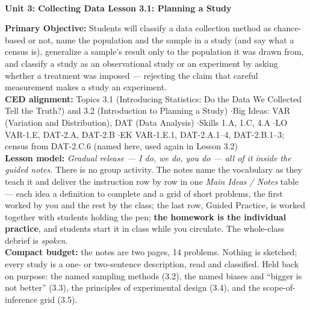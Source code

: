 \documentclass[10pt]{article}
\newcommand{\UnitNumberName}{Unit 3: Collecting Data \quad}
\newcommand{\LessonNumberName}{Lesson 3.1: Planning a Study}
\begin{document}
\begin{center}
    {\Large\bfseries \CourseName \\
    {\small\bfseries \UnitNumberName \LessonNumberName}}
\end{center}

\begin{tcolorbox}[colback=sky, colframe=navy, boxrule=0.9pt, arc=2mm,
    left=2mm, right=2mm, top=1.5mm, bottom=1.5mm]
    \textbf{Primary Objective:} Students will classify a data collection method as chance-based
    or not, name the population and the sample in a study (and say what a census is),
    generalize a sample's result only to the population it was drawn from, and classify a study
    as an observational study or an experiment by asking whether a treatment was imposed ---
    rejecting the claim that careful measurement makes a study an experiment.
    \\[2pt]
    \textbf{CED alignment:} Topics 3.1 (Introducing Statistics: Do the Data We Collected Tell
    the Truth?) and 3.2 (Introduction to Planning a Study) \quad$\cdot$\quad Big Ideas: VAR
    (Variation and Distribution), DAT (Data Analysis) \quad$\cdot$\quad Skills 1.A, 1.C, 4.A
    \quad$\cdot$\quad LO VAR-1.E, DAT-2.A, DAT-2.B \quad$\cdot$\quad EK VAR-1.E.1, DAT-2.A.1--4,
    DAT-2.B.1--3; census from DAT-2.C.6 (named here, used again in Lesson 3.2)
    \\[2pt]
    \textbf{Lesson model:} \emph{Gradual release --- I do, we do, you do --- all of it inside
    the guided notes.} There is no group activity. The notes name the vocabulary as they teach
    it and deliver the instruction row by row in one \emph{Main Ideas / Notes} table --- each
    idea a definition to complete and a grid of short problems, the first worked by you and the
    rest by the class; the last row, Guided Practice, is worked together with students holding
    the pen; \textbf{the homework is the individual practice}, and students start it in class
    while you circulate. The whole-class debrief is \emph{spoken}.
    \\[2pt]
    \textbf{Compact budget:} the notes are two pages, 14 problems. Nothing is sketched; every
    study is a one- or two-sentence description, read and classified. Held back on purpose: the
    named sampling methods (3.2), the named biases and ``bigger is not better'' (3.3), the
    principles of experimental design (3.4), and the scope-of-inference grid (3.5).
\end{tcolorbox}
\end{document}
